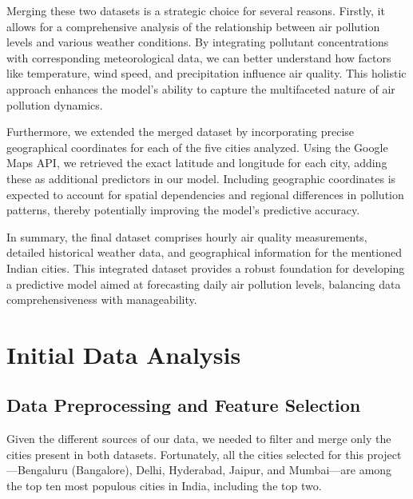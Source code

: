 \documentclass[12pt]{article}
\begin{document}
Merging these two datasets is a strategic choice for several reasons. Firstly, it allows for a comprehensive analysis of the relationship between air pollution levels and various weather conditions. By integrating pollutant concentrations with corresponding meteorological data, we can better understand how factors like temperature, wind speed, and precipitation influence air quality. This holistic approach enhances the model's ability to capture the multifaceted nature of air pollution dynamics.

Furthermore, we extended the merged dataset by incorporating precise geographical coordinates for each of the five cities analyzed. Using the Google Maps API, we retrieved the exact latitude and longitude for each city, adding these as additional predictors in our model. Including geographic coordinates is expected to account for spatial dependencies and regional differences in pollution patterns, thereby potentially improving the model's predictive accuracy.

In summary, the final dataset comprises hourly air quality measurements, detailed historical weather data, and geographical information for the mentioned Indian cities. This integrated dataset provides a robust foundation for developing a predictive model aimed at forecasting daily air pollution levels, balancing data comprehensiveness with manageability.

\newpage




\section{Initial Data Analysis}

\subsection{Data Preprocessing and Feature Selection}

Given the different sources of our data, we needed to filter and merge only the cities present in both datasets. Fortunately, all the cities selected for this project---Bengaluru (Bangalore), Delhi, Hyderabad, Jaipur, and Mumbai---are among the top ten most populous cities in India, including the top two.
\end{document}
